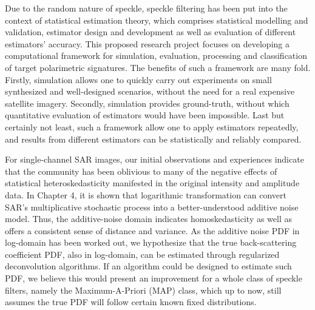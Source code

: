 Due to the random nature of speckle, speckle filtering has been put into the context of statistical estimation theory, which comprises statistical modelling and validation, estimator design and development as well as evaluation of different estimators' accuracy.
This proposed research project focuses on developing a computational framework for simulation, evaluation, processing and classification of target polarimetric signatures.
The benefits of such a framework are many fold.
Firstly, simulation allows one to quickly carry out experiments on small synthesized and well-designed scenarios, without the need for a real expensive satellite imagery.
Secondly, simulation provides ground-truth, without which quantitative evaluation of estimators would have been impossible.
Last but certainly not least, such a framework allow one to apply estimators repeatedly, and results from different estimators can be statistically and reliably compared.
 
For single-channel SAR images, our initial observations and experiences indicate that the community has been oblivious to many of the negative effects of statistical heteroskedasticity manifested in the original intensity and amplitude data.
In Chapter 4, it is shown that logarithmic transformation can convert SAR's multiplicative stochastic process into a better-understood additive noise model.
Thus, the additive-noise domain indicates homoskedasticity as well as offers a consistent sense of distance and variance.
As the additive noise PDF in log-domain has been worked out, we hypothesize that the true back-scattering coefficient PDF, also in log-domain, can be estimated through regularized deconvolution algorithms.
If an algorithm could be designed to estimate such PDF, we believe this would present an improvement for a whole class of speckle filters, namely the Maximum-A-Priori (MAP) class, which up to now, still assumes the true PDF will follow certain known fixed distributions.

